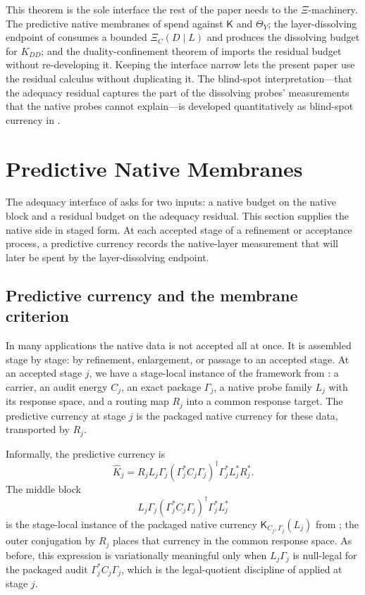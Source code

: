 \documentclass[11pt]{article}
\newcommand{\K}{\mathsf K}
\newcommand{\XiRes}{\Xi}
\theoremstyle{definition}
\begin{document}
This theorem is the sole interface the rest of the paper needs to the
\(\XiRes\)-machinery.  The predictive native membranes of
 spend against \(\K\) and \(\Theta_Y\);
the layer-dissolving endpoint of  consumes a
bounded \(\XiRes_C(D\mid L)\) and produces the dissolving budget for
\(K_{DD}\); and the duality-confinement theorem of
 imports the residual budget without
re-developing it.  Keeping the interface narrow lets the present paper
use the residual calculus without duplicating it.  The blind-spot
interpretation---that the adequacy residual captures the part of the
dissolving probes' measurements that the native probes cannot
explain---is developed quantitatively as blind-spot currency in
\citet{Tsiokos2026XiCompanion}.

 

\section{Predictive Native Membranes}
\label{sec:predictive-membranes}

The adequacy interface of  asks for two inputs:
a native budget on the native block and a residual budget on the
adequacy residual.  This section supplies the native side in staged
form.  At each accepted stage of a refinement or acceptance process, a
predictive currency records the native-layer measurement that will later
be spent by the layer-dissolving endpoint.

\subsection{Predictive currency and the membrane criterion}

In many applications the native data is not accepted all at once.  It is
assembled stage by stage: by refinement, enlargement, or passage to an
accepted stage.  At an accepted stage \(j\), we have a stage-local
instance of the framework from : a carrier, an audit
energy \(C_j\), an exact package \(\Gamma_j\), a native probe family
\(L_j\) with its response space, and a routing map \(R_j\) into a common
response target.  The predictive currency at stage \(j\) is the
packaged native currency for these data, transported by \(R_j\).

Informally, the predictive currency is
\[
  \widehat K_j
  =R_jL_j\Gamma_j(\Gamma_j^*C_j\Gamma_j)^\dagger
    \Gamma_j^*L_j^*R_j^*.
\]
The middle block
\[
  L_j\Gamma_j(\Gamma_j^*C_j\Gamma_j)^\dagger\Gamma_j^*L_j^*
\]
is the stage-local instance of the packaged native currency
\(\K_{C_j,\Gamma_j}(L_j)\) from ; the outer
conjugation by \(R_j\) places that currency in the common response
space.  As before, this expression is variationally meaningful only
when \(L_j\Gamma_j\) is null-legal for the packaged audit
\(\Gamma_j^*C_j\Gamma_j\), which is the legal-quotient discipline of
 applied at stage \(j\).
\end{document}
